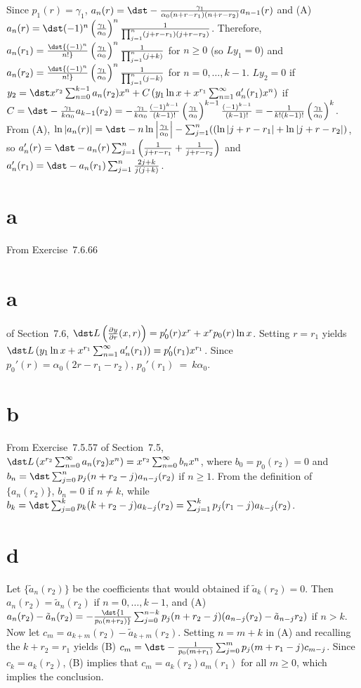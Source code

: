 \documentclass[dvips]{book}
\renewcommand{\exer}[1]{\par\medskip\;\noindent{\color{red}\bf #1.}}
\numberwithin{example}{section}
\numberwithin{equation}{section}
\numberwithin{theorem}{section}
\numberwithin{table}{section}
\numberwithin{figure}{section}
\begin{document}
\exer{7.7.46} Since $p_1(r)=\gamma_1$,
$a_n(r)=\dst-{\gamma_1\over\alpha_0(n+r-r_1)(n+r-r_2)}a_{n-1}(r)$ and
(A) $a_n(r)=\dst(-1)^n\left(\gamma_1\over\alpha_0\right)^n
{1\over\prod_{j=1}^n(j+r-r_1)(j+r-r_2)}$. Therefore,
$a_n(r_1)=\dst{(-1)^n\over n!}\left(\gamma_1\over\alpha_0\right)^n
{1\over\prod_{j=1}^n(j+k)}$ for $n\ge0$ (so $Ly_1=0$) and
$a_n(r_2)=\dst{(-1)^n\over n!}\left(\gamma_1\over\alpha_0\right)^n
{1\over\prod_{j=1}^n(j-k)}$ for $n=0,\dots,k-1$. $Ly_2=0$ if $y_2=\dst
x^{r_2}\sum_{n=0}^{k-1} a_n(r_2)x^n+C\left(y_1\ln x+
x^{r_1}\sum_{n=1}^\infty a_n'(r_1)x^n\right)$ if
$C=\dst-{\gamma_1\over k\alpha_0}a_{k-1}(r_2)=-{\gamma_1\over
k\alpha_0}{(-1)^{k-1}\over(k-1)!}
\left(\gamma_1\over\alpha_0\right)^{k-1}{(-1)^{k-1}\over(k-1)!}
=-{1\over k!(k-1)!} \left(\gamma_1\over\alpha_0\right)^k$. From (A),
$\ln|a_n(r)|=\dst-n\ln\left|\gamma_1\over\alpha_0\right|
-\sum_{j=1}^n(\left(\ln|j+r-r_1|+\ln|j+r-r_2|\right)$, so
$a_n'(r)=\dst-a_n(r)\sum_{j=1}^n\left({1\over j+r-r_1}+ {1\over
j+r-r_2}\right)$ and $a_n'(r_1)=\dst-a_n(r_1)\sum_{j=1}^n {2j+k\over
j(j+k)}$.



\exer{7.7.48} \part{a} From Exercise~7.6.66\part{a} of
Section~7.6, $\dst L\left({\partial y\over \partial
r}(x,r)\right)=p'_0(r)x^r+x^rp_0(r)\ln x$. Setting $r=r_1$ yields
$\dst L\left(y_1\ln x+x^{r_1}\sum_{n=1}^\infty
a_n'(r_1)\right)=p_0'(r_1)x^{r_1}$. Since
$p_0'(r)=\alpha_0(2r-r_1-r_2)$, $p_0'(r_1)~=~k\alpha_0$.

\part{b} From Exercise~7.5.57 of Section~7.5, $\dst
L\left(x^{r_2}\sum_{n=0}^\infty a_n(r_2)x^n\right)=x^{r_2}
\sum_{n=0}^\infty b_nx^n$, where $b_0=p_0(r_2)=0$ and
$b_n=\dst\sum_{j=0}^np_j(n+r_2-j)a_{n-j}(r_2)$ if $n\ge1$. From the
definition of $\{a_n(r_2)\}$, $b_n=0$ if $n\ne k$, while
$b_k=\dst\sum_{j=0}^kp_k(k+r_2-j)a_{k-j}(r_2)=
\sum_{j=1}^kp_j(r_1-j)a_{k-j}(r_2)$.

\part{d} Let $\{\tilde a_n(r_2)\}$ be the coefficients that would
obtained if $\tilde a_k(r_2)=0$. Then $a_n(r_2)=\tilde a_n(r_2)$ if
$n=0,\dots,k-1$, and (A) $a_n(r_2)-\tilde a_n(r_2)=-\dst{1\over
p_0(n+r_2)}\sum_{j=0}^{n-k} p_j(n+r_2-j)(a_{n-j}(r_2)-\tilde
a_{n-j}{r_2})$ if $n>k$. Now let $c_m=a_{k+m}(r_2)-\tilde
a_{k+m}(r_2)$. Setting $n=m+k$ in (A) and recalling the $k+r_2=r_1$
yields (B) $c_m=\dst-{1\over p_0(m+r_1)}\sum_{j=0}^m
p_j(m+r_1-j)c_{m-j}$. Since $c_k=a_k(r_2)$, (B) implies that
$c_m=a_k(r_2)a_m(r_1)$ for all $m\ge0$, which implies the conclusion.
\end{document}
